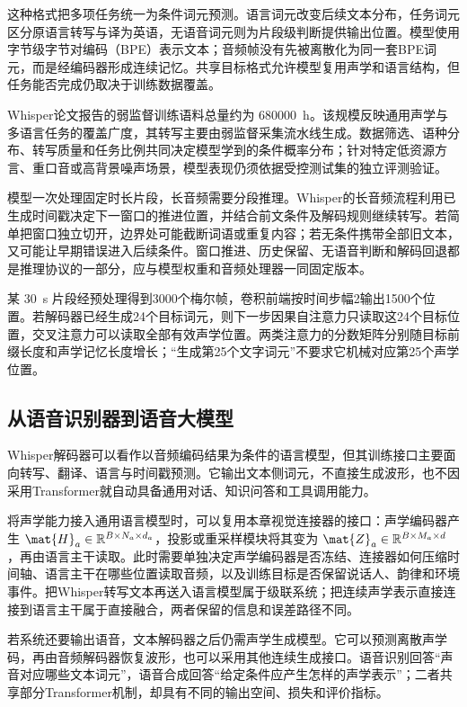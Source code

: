 \documentclass[../textbook.tex]{subfiles}
\begin{document}
这种格式把多项任务统一为条件词元预测。语言词元改变后续文本分布，任务词元区分原语言转写与译为英语，无语音词元则为片段级判断提供输出位置。模型使用字节级字节对编码（BPE）表示文本；音频帧没有先被离散化为同一套BPE词元，而是经编码器形成连续记忆。共享目标格式允许模型复用声学和语言结构，但任务能否完成仍取决于训练数据覆盖。

Whisper论文报告的弱监督训练语料总量约为 \qty{680000}{\hour}\cite{radford2022whisper}。该规模反映通用声学与多语言任务的覆盖广度，其转写主要由弱监督采集流水线生成。数据筛选、语种分布、转写质量和任务比例共同决定模型学到的条件概率分布；针对特定低资源方言、重口音或高背景噪声场景，模型表现仍须依据受控测试集的独立评测验证。

模型一次处理固定时长片段，长音频需要分段推理。Whisper的长音频流程利用已生成时间戳决定下一窗口的推进位置，并结合前文条件及解码规则继续转写。若简单把窗口独立切开，边界处可能截断词语或重复内容；若无条件携带全部旧文本，又可能让早期错误进入后续条件。窗口推进、历史保留、无语音判断和解码回退都是推理协议的一部分，应与模型权重和音频处理器一同固定版本。

\begin{example}
某 \qty{30}{\second} 片段经预处理得到3000个梅尔帧，卷积前端按时间步幅2输出1500个位置。若解码器已经生成24个目标词元，则下一步因果自注意力只读取这24个目标位置，交叉注意力可以读取全部有效声学位置。两类注意力的分数矩阵分别随目标前缀长度和声学记忆长度增长；“生成第25个文字词元”不要求它机械对应第25个声学位置。
\end{example}

\subsection{从语音识别器到语音大模型}
Whisper解码器可以看作以音频编码结果为条件的语言模型，但其训练接口主要面向转写、翻译、语言与时间戳预测。它输出文本侧词元，不直接生成波形，也不因采用Transformer就自动具备通用对话、知识问答和工具调用能力。

将声学能力接入通用语言模型时，可以复用本章视觉连接器的接口：声学编码器产生 $\mat{H}_a\in\mathbb R^{B\times N_a\times d_a}$，投影或重采样模块将其变为 $\mat{Z}_a\in\mathbb R^{B\times M_a\times d}$，再由语言主干读取。此时需要单独决定声学编码器是否冻结、连接器如何压缩时间轴、语言主干在哪些位置读取音频，以及训练目标是否保留说话人、韵律和环境事件。把Whisper转写文本再送入语言模型属于级联系统；把连续声学表示直接连接到语言主干属于直接融合，两者保留的信息和误差路径不同。

若系统还要输出语音，文本解码器之后仍需声学生成模型。它可以预测离散声学码，再由音频解码器恢复波形，也可以采用其他连续生成接口。语音识别回答“声音对应哪些文本词元”，语音合成回答“给定条件应产生怎样的声学表示”；二者共享部分Transformer机制，却具有不同的输出空间、损失和评价指标。
\end{document}
